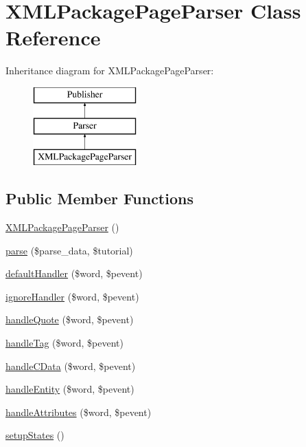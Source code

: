 \hypertarget{class_x_m_l_package_page_parser}{\section{\-X\-M\-L\-Package\-Page\-Parser \-Class \-Reference}
\label{class_x_m_l_package_page_parser}
}
\-Inheritance diagram for \-X\-M\-L\-Package\-Page\-Parser\-:\begin{figure}[H]
\begin{center}
\leavevmode
\includegraphics[height=3.000000cm]{class_x_m_l_package_page_parser}
\end{center}
\end{figure}
\subsection*{\-Public \-Member \-Functions}
\begin{DoxyCompactItemize}
\item 
\hyperlink{class_x_m_l_package_page_parser_a0b9ff2d1fc17f428271474485462ac49}{\-X\-M\-L\-Package\-Page\-Parser} ()
\item 
\hyperlink{class_x_m_l_package_page_parser_a45e18b3d81c9a92a93c8ca4bb39aac9d}{parse} (\$parse\-\_\-data, \$tutorial)
\item 
\hyperlink{class_x_m_l_package_page_parser_a4d5d6de1bd28d678fdca6e4d5e0076b0}{default\-Handler} (\$word, \$pevent)
\item 
\hyperlink{class_x_m_l_package_page_parser_a3672b7e387fe0252588ce70ed5289dd7}{ignore\-Handler} (\$word, \$pevent)
\item 
\hyperlink{class_x_m_l_package_page_parser_a4ba20cc549548714f50dafced3b6ec71}{handle\-Quote} (\$word, \$pevent)
\item 
\hyperlink{class_x_m_l_package_page_parser_a04c9d956763b0f5c797a3c75f6aee07b}{handle\-Tag} (\$word, \$pevent)
\item 
\hyperlink{class_x_m_l_package_page_parser_a12710cbcec63d04579a8857a19c6d942}{handle\-C\-Data} (\$word, \$pevent)
\item 
\hyperlink{class_x_m_l_package_page_parser_ad43a284f751e91952b6ec25f31bc6782}{handle\-Entity} (\$word, \$pevent)
\item 
\hyperlink{class_x_m_l_package_page_parser_a3c0943f8844d0d531ffff0fb43c36bd4}{handle\-Attributes} (\$word, \$pevent)
\item 
\hyperlink{class_x_m_l_package_page_parser_abe4d21ebe5f9d4088e7be4271603cd5e}{setup\-States} ()
\end{DoxyCompactItemize}
